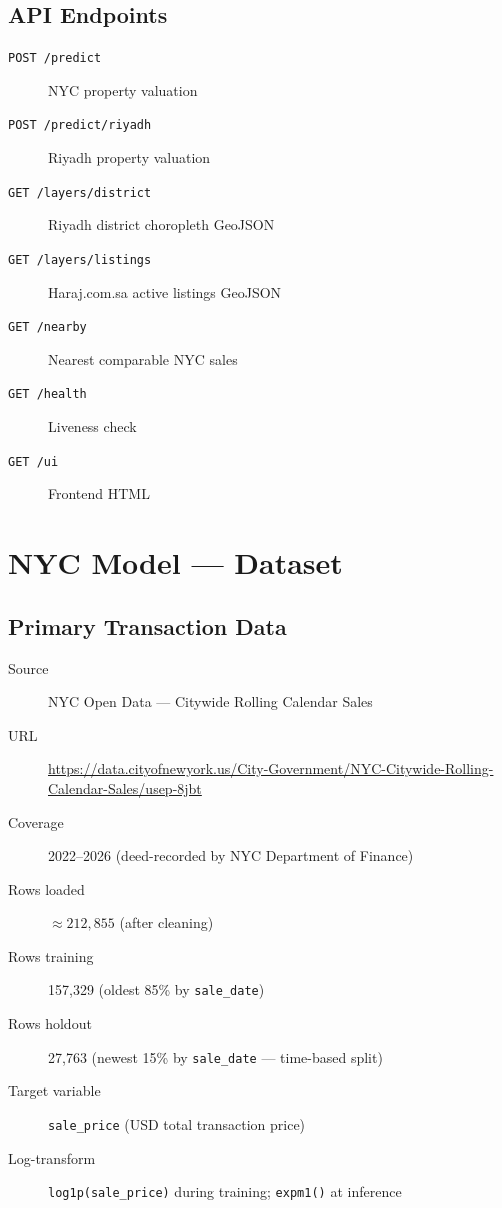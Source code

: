 \documentclass[11pt, a4paper, twoside]{report}
\begin{document}
\section{API Endpoints}
\begin{description}
  \item[\texttt{POST /predict}]         NYC property valuation
  \item[\texttt{POST /predict/riyadh}]  Riyadh property valuation
  \item[\texttt{GET /layers/district}]  Riyadh district choropleth GeoJSON
  \item[\texttt{GET /layers/listings}]  Haraj.com.sa active listings GeoJSON
  \item[\texttt{GET /nearby}]           Nearest comparable NYC sales
  \item[\texttt{GET /health}]           Liveness check
  \item[\texttt{GET /ui}]               Frontend HTML
\end{description}

\chapter{NYC Model --- Dataset}
\label{ch:nyc_data}

\section{Primary Transaction Data}
\begin{description}
  \item[Source] NYC Open Data --- Citywide Rolling Calendar Sales
  \item[URL] \url{https://data.cityofnewyork.us/City-Government/NYC-Citywide-Rolling-Calendar-Sales/usep-8jbt}
  \item[Coverage] 2022--2026 (deed-recorded by NYC Department of Finance)
  \item[Rows loaded] $\approx 212,855$ (after cleaning)
  \item[Rows training] 157,329 (oldest 85\% by \texttt{sale\_date})
  \item[Rows holdout] 27,763 (newest 15\% by \texttt{sale\_date} --- time-based split)
  \item[Target variable] \texttt{sale\_price} (USD total transaction price)
  \item[Log-transform] \texttt{log1p(sale\_price)} during training; \texttt{expm1()} at inference
\end{description}
\end{document}
